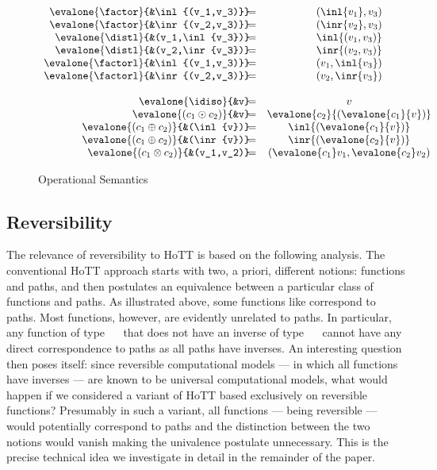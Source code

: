 \begin{figure*}[ht]
\begin{multicols}{2}
\[\begin{array}{r@{\!}lcl}
\evalone{\factor}{&\inl{(v_1,v_3)}} &=& (\inl{v_1},v_3) \\
\evalone{\factor}{&\inr{(v_2,v_3)}} &=& (\inr{v_2},v_3) \\
\evalone{\distl}{&(v_1,\inl{v_3})} &=& \inl{(v_1,v_3)} \\
\evalone{\distl}{&(v_2,\inr{v_3})} &=& \inr{(v_2,v_3)} \\
\evalone{\factorl}{&\inl{(v_1,v_3)}} &=& (v_1,\inl{v_3}) \\
\evalone{\factorl}{&\inr{(v_2,v_3)}} &=& (v_2,\inr{v_3}) \\
\\
\evalone{\idiso}{&v} &=& v \\
\evalone{(c_1 \odot c_2)}{&v} &=& 
  \evalone{c_2}{(\evalone{c_1}{v})} \\
\evalone{(c_1 \oplus c_2)}{&(\inl{v})} &=& 
  \inl{(\evalone{c_1}{v})} \\
\evalone{(c_1 \oplus c_2)}{&(\inr{v})} &=& 
  \inr{(\evalone{c_2}{v})} \\
\evalone{(c_1 \otimes c_2)}{&(v_1,v_2)} &=& 
  (\evalone{c_1}v_1, \evalone{c_2}v_2) 
\end{array}\]
\end{multicols}
\caption{\label{opsem}Operational Semantics}
\end{figure*}

\subsection{Reversibility} 

The relevance of reversibility to HoTT is based on the following
analysis. The conventional HoTT approach starts with two, a priori, different
notions: functions and paths, and then postulates an equivalence between a
particular class of functions and paths. As illustrated above, some functions
like  correspond to paths. Most functions, however, are
evidently unrelated to paths. In particular, any function of type
~~ that does not have an inverse of
type ~~ cannot have any direct
correspondence to paths as all paths have inverses. An interesting question
then poses itself: since reversible computational models --- in which all
functions have inverses --- are known to be universal computational models,
what would happen if we considered a variant of HoTT based exclusively on
reversible functions?  Presumably in such a variant, all functions --- being
reversible --- would potentially correspond to paths and the distinction
between the two notions would vanish making the univalence postulate
unnecessary. This is the precise technical idea we investigate in detail in
the remainder of the paper.

